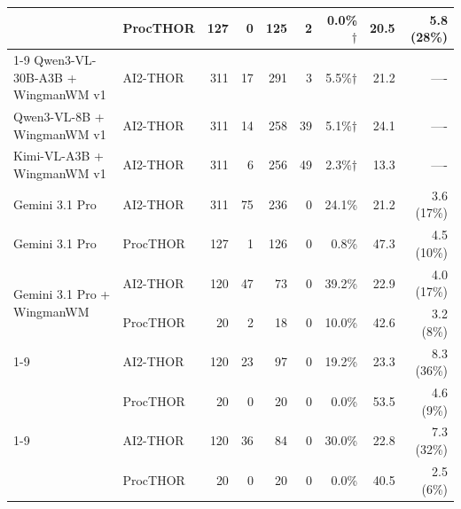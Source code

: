 \begin{table}[t]
\begin{tabular}{llrrrrrrr}
     & ProcTHOR & 127 & 0 & 125 & 2 & 0.0\%$\dagger$ & 20.5 & 5.8 (28\%) \\
    \cmidrule(l){1-9}
    Qwen3-VL-30B-A3B + WingmanWM v1 & AI2-THOR & 311 & 17 & 291 & 3 & 5.5\%$\dagger$ & 21.2 & ---- \\
    Qwen3-VL-8B + WingmanWM v1 & AI2-THOR & 311 & 14 & 258 & 39 & 5.1\%$\dagger$ & 24.1 & ---- \\
    Kimi-VL-A3B + WingmanWM v1 & AI2-THOR & 311 & 6 & 256 & 49 & 2.3\%$\dagger$ & 13.3 & ---- \\
    Gemini 3.1 Pro & AI2-THOR & 311 & 75 & 236 & 0 & 24.1\% & 21.2 & 3.6 (17\%) \\
    Gemini 3.1 Pro & ProcTHOR & 127 & 1 & 126 & 0 & 0.8\% & 47.3 & 4.5 (10\%) \\
    \multirow{2}{*}{Gemini 3.1 Pro + WingmanWM} & AI2-THOR & 120 & 47 & 73 & 0 & 39.2\% & 22.9 & 4.0 (17\%) \\
     & ProcTHOR & 20 & 2 & 18 & 0 & 10.0\% & 42.6 & 3.2 (8\%) \\
    \cmidrule(l){1-9}
    \multirow{2}{*}{GPT-5} & AI2-THOR & 120 & 23 & 97 & 0 & 19.2\% & 23.3 & 8.3 (36\%) \\
     & ProcTHOR & 20 & 0 & 20 & 0 & 0.0\% & 53.5 & 4.6 (9\%) \\
    \cmidrule(l){1-9}
    \multirow{2}{*}{GPT-5 + WingmanWM} & AI2-THOR & 120 & 36 & 84 & 0 & 30.0\% & 22.8 & 7.3 (32\%) \\
     & ProcTHOR & 20 & 0 & 20 & 0 & 0.0\% & 40.5 & 2.5 (6\%) \\
    \bottomrule
  \end{tabular}
\end{table}
